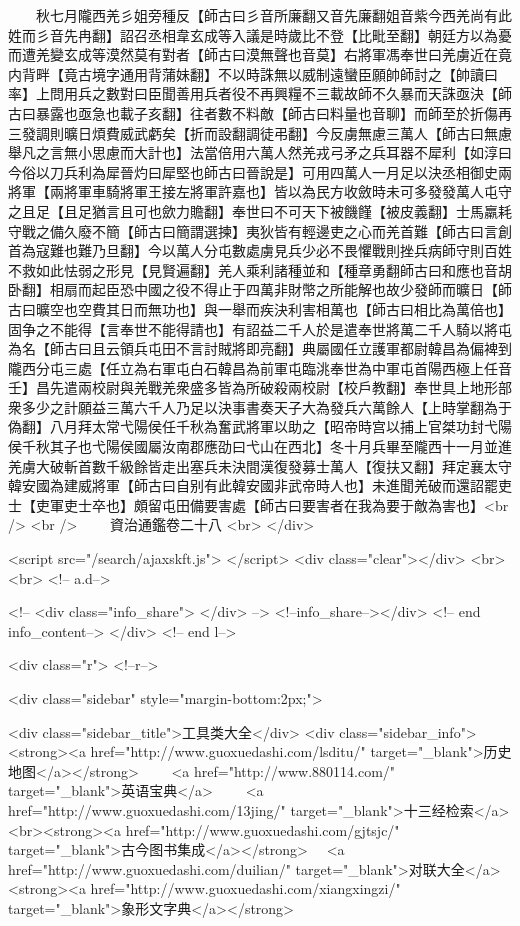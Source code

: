 　　秋七月隴西羌彡姐旁種反【師古曰彡音所廉翻又音先廉翻姐音紫今西羌尚有此姓而彡音先冉翻】詔召丞相韋玄成等入議是時歲比不登【比毗至翻】朝廷方以為憂而遭羌變玄成等漠然莫有對者【師古曰漠無聲也音莫】右將軍馮奉世曰羌虜近在竟内背畔【竟古境字通用背蒲妹翻】不以時誅無以威制遠蠻臣願帥師討之【帥讀曰率】上問用兵之數對曰臣聞善用兵者役不再興糧不三載故師不久暴而天誅亟決【師古曰暴露也亟急也載子亥翻】往者數不料敵【師古曰料量也音聊】而師至於折傷再三發調則曠日煩費威武虧矣【折而設翻調徒弔翻】今反虜無慮三萬人【師古曰無慮舉凡之言無小思慮而大計也】法當倍用六萬人然羌戎弓矛之兵耳器不犀利【如淳曰今俗以刀兵利為犀晉灼曰犀堅也師古曰晉說是】可用四萬人一月足以決丞相御史兩將軍【兩將軍車騎將軍王接左將軍許嘉也】皆以為民方收斂時未可多發發萬人屯守之且足【且足猶言且可也歛力贍翻】奉世曰不可天下被饑饉【被皮義翻】士馬羸耗守戰之備久廢不簡【師古曰簡謂選揀】夷狄皆有輕邊吏之心而羌首難【師古曰言創首為寇難也難乃旦翻】今以萬人分屯數處虜見兵少必不畏懼戰則挫兵病師守則百姓不救如此怯弱之形見【見賢遍翻】羌人乘利諸種並和【種章勇翻師古曰和應也音胡卧翻】相扇而起臣恐中國之役不得止于四萬非財幣之所能解也故少發師而曠日【師古曰曠空也空費其日而無功也】與一舉而疾決利害相萬也【師古曰相比為萬倍也】固争之不能得【言奉世不能得請也】有詔益二千人於是遣奉世將萬二千人騎以將屯為名【師古曰且云領兵屯田不言討賊將即亮翻】典屬國任立護軍都尉韓昌為偏裨到隴西分屯三處【任立為右軍屯白石韓昌為前軍屯臨洮奉世為中軍屯首陽西極上任音壬】昌先遣兩校尉與羌戰羌衆盛多皆為所破殺兩校尉【校戶教翻】奉世具上地形部衆多少之計願益三萬六千人乃足以決事書奏天子大為發兵六萬餘人【上時掌翻為于偽翻】八月拜太常弋陽侯任千秋為奮武將軍以助之【昭帝時宫以捕上官桀功封弋陽侯千秋其子也弋陽侯國屬汝南郡應劭曰弋山在西北】冬十月兵畢至隴西十一月並進羌虜大破斬首數千級餘皆走出塞兵未決間漢復發募士萬人【復扶又翻】拜定襄太守韓安國為建威將軍【師古曰自别有此韓安國非武帝時人也】未進聞羌破而還詔罷吏士【吏軍吏士卒也】頗留屯田備要害處【師古曰要害者在我為要于敵為害也】<br />
<br />
　　資治通鑑卷二十八  <br>
   </div> 

<script src="/search/ajaxskft.js"> </script>
 <div class="clear"></div>
<br>
<br>
 <!-- a.d-->

 <!--
<div class="info_share">
</div> 
-->
 <!--info_share--></div>   <!-- end info_content-->
  </div> <!-- end l-->

<div class="r">   <!--r-->



<div class="sidebar"  style="margin-bottom:2px;">

 
<div class="sidebar_title">工具类大全</div>
<div class="sidebar_info">
<strong><a href="http://www.guoxuedashi.com/lsditu/" target="_blank">历史地图</a></strong>　　
<a href="http://www.880114.com/" target="_blank">英语宝典</a>　　
<a href="http://www.guoxuedashi.com/13jing/" target="_blank">十三经检索</a>　
<br><strong><a href="http://www.guoxuedashi.com/gjtsjc/" target="_blank">古今图书集成</a></strong>　
<a href="http://www.guoxuedashi.com/duilian/" target="_blank">对联大全</a>　<strong><a href="http://www.guoxuedashi.com/xiangxingzi/" target="_blank">象形文字典</a></strong>　


